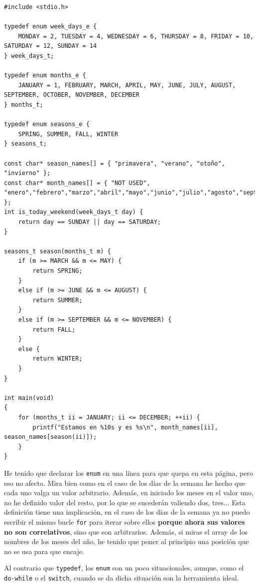 \documentclass[a4paper]{article}
\begin{document}
\noindent
\begin{minipage}[H]{\linewidth}
\mbox{}
\begin{lstlisting}[style=C,
caption={Ejemplo final de enumerados},
label={lst:finalEnums}]
#include <stdio.h>

typedef enum week_days_e {
    MONDAY = 2, TUESDAY = 4, WEDNESDAY = 6, THURSDAY = 8, FRIDAY = 10, SATURDAY = 12, SUNDAY = 14
} week_days_t;

typedef enum months_e {
    JANUARY = 1, FEBRUARY, MARCH, APRIL, MAY, JUNE, JULY, AUGUST, SEPTEMBER, OCTOBER, NOVEMBER, DECEMBER
} months_t;

typedef enum seasons_e {
    SPRING, SUMMER, FALL, WINTER
} seasons_t;

const char* season_names[] = { "primavera", "verano", "otoño", "invierno" };
const char* month_names[] = { "NOT USED", "enero","febrero","marzo","abril","mayo","junio","julio","agosto","septiembre","octubre","noviembre","diciembre" };
int is_today_weekend(week_days_t day) {
    return day == SUNDAY || day == SATURDAY;
}

seasons_t season(months_t m) {
    if (m >= MARCH && m <= MAY) {
        return SPRING;
    }
    else if (m >= JUNE && m <= AUGUST) {
        return SUMMER;
    }
    else if (m >= SEPTEMBER && m <= NOVEMBER) {
        return FALL;
    }
    else {
        return WINTER;
    }
}

int main(void)
{
    for (months_t ii = JANUARY; ii <= DECEMBER; ++ii) {
        printf("Estamos en %10s y es %s\n", month_names[ii], season_names[season(ii)]);
    }
}
\end{lstlisting}
\end{minipage}

He tenido que declarar los \verb!enum! en una línea para que quepa en esta
página, pero eso no afecta. Mira bien como en el caso de los días de la semana
he hecho que cada uno valga un valor arbitrario. Además, en iniciado los meses
en el valor uno, no he definido valor del resto, por lo que se sucederán
valiendo dos, tres... Esta definición tiene una implicación, en el
caso de los días de la semana ya no puedo escribir el mismo
bucle \verb!for! para iterar sobre
ellos \textbf{porque ahora sus valores no son correlativos},
sino que son arbitrarios. Además, si miras el array de
los nombres de los meses del año, he tenido que poner al principio una
posición que no se usa para que encaje.

Al contrario que \verb!typedef!, los \verb!enum! son un poco situacionales,
aunque, como el \verb!do-while! o el \verb!switch!, cuando se da dicha situación
son la herramienta ideal.
\end{document}
